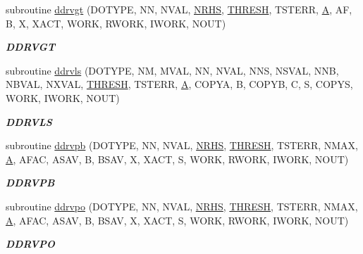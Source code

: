 \begin{DoxyCompactItemize}
subroutine \hyperlink{group__double__lin_ga07b2fc110a27676eff5586dbada83380}{ddrvgt} (D\+O\+T\+Y\+P\+E, N\+N, N\+V\+A\+L, \hyperlink{example__user_8c_aa0138da002ce2a90360df2f521eb3198}{N\+R\+H\+S}, \hyperlink{zlaqgs_8c_a0656018abfc9fa2821827415f5d5ea57}{T\+H\+R\+E\+S\+H}, T\+S\+T\+E\+R\+R, \hyperlink{classA}{A}, A\+F, B, X, X\+A\+C\+T, W\+O\+R\+K, R\+W\+O\+R\+K, I\+W\+O\+R\+K, N\+O\+U\+T)
\begin{DoxyCompactList}\small\item\em {\bfseries D\+D\+R\+V\+G\+T} \end{DoxyCompactList}\item 
subroutine \hyperlink{group__double__lin_ga6d0fca40483a7fdfedffeda43e27f0be}{ddrvls} (D\+O\+T\+Y\+P\+E, N\+M, M\+V\+A\+L, N\+N, N\+V\+A\+L, N\+N\+S, N\+S\+V\+A\+L, N\+N\+B, N\+B\+V\+A\+L, N\+X\+V\+A\+L, \hyperlink{zlaqgs_8c_a0656018abfc9fa2821827415f5d5ea57}{T\+H\+R\+E\+S\+H}, T\+S\+T\+E\+R\+R, \hyperlink{classA}{A}, C\+O\+P\+Y\+A, B, C\+O\+P\+Y\+B, C, S, C\+O\+P\+Y\+S, W\+O\+R\+K, I\+W\+O\+R\+K, N\+O\+U\+T)
\begin{DoxyCompactList}\small\item\em {\bfseries D\+D\+R\+V\+L\+S} \end{DoxyCompactList}\item 
subroutine \hyperlink{group__double__lin_gab8fcbd3a0330e0cc527d2724e1ef8868}{ddrvpb} (D\+O\+T\+Y\+P\+E, N\+N, N\+V\+A\+L, \hyperlink{example__user_8c_aa0138da002ce2a90360df2f521eb3198}{N\+R\+H\+S}, \hyperlink{zlaqgs_8c_a0656018abfc9fa2821827415f5d5ea57}{T\+H\+R\+E\+S\+H}, T\+S\+T\+E\+R\+R, N\+M\+A\+X, \hyperlink{classA}{A}, A\+F\+A\+C, A\+S\+A\+V, B, B\+S\+A\+V, X, X\+A\+C\+T, S, W\+O\+R\+K, R\+W\+O\+R\+K, I\+W\+O\+R\+K, N\+O\+U\+T)
\begin{DoxyCompactList}\small\item\em {\bfseries D\+D\+R\+V\+P\+B} \end{DoxyCompactList}\item 
subroutine \hyperlink{group__double__lin_ga5cf8f394bfad5f40cbea9f332324313e}{ddrvpo} (D\+O\+T\+Y\+P\+E, N\+N, N\+V\+A\+L, \hyperlink{example__user_8c_aa0138da002ce2a90360df2f521eb3198}{N\+R\+H\+S}, \hyperlink{zlaqgs_8c_a0656018abfc9fa2821827415f5d5ea57}{T\+H\+R\+E\+S\+H}, T\+S\+T\+E\+R\+R, N\+M\+A\+X, \hyperlink{classA}{A}, A\+F\+A\+C, A\+S\+A\+V, B, B\+S\+A\+V, X, X\+A\+C\+T, S, W\+O\+R\+K, R\+W\+O\+R\+K, I\+W\+O\+R\+K, N\+O\+U\+T)
\begin{DoxyCompactList}\small\item\em {\bfseries D\+D\+R\+V\+P\+O} \end{DoxyCompactList}\item 

\end{DoxyCompactItemize}
